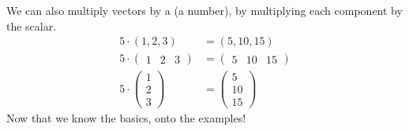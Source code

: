 \documentclass{ximera}
\begin{document}
We can also multiply vectors by a  (a number), by
multiplying each component by the scalar.
\begin{align*}
  5\cdot   (1,2,3) &= (5,10,15)\\
  5\cdot \begin{pmatrix} 1 & 2 & 3   \end{pmatrix}  &= \begin{pmatrix} 5 & 10 & 15   \end{pmatrix}\\
  5\cdot  \begin{pmatrix} 1\\ 2\\ 3   \end{pmatrix} &= \begin{pmatrix} 5\\ 10\\ 15   \end{pmatrix}
\end{align*}
Now that we know the basics, onto the examples!
\end{document}
